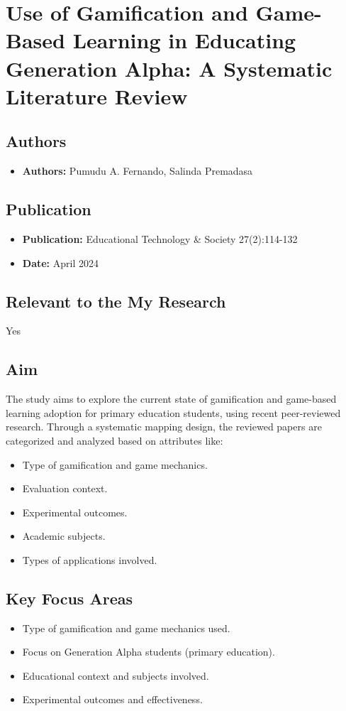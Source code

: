 \section{Use of Gamification and Game-Based Learning in Educating Generation Alpha: A Systematic Literature Review}

\subsection{Authors}
\begin{itemize}
    \item \textbf{Authors:} Pumudu A. Fernando, Salinda Premadasa
\end{itemize}

\subsection{Publication}
\begin{itemize}
    \item \textbf{Publication:} Educational Technology \& Society 27(2):114-132
    \item \textbf{Date:} April 2024 
\end{itemize}

\subsection{Relevant to the My Research}
Yes

\subsection{Aim}
The study aims to explore the current state of gamification and game-based learning adoption for primary education students, using recent peer-reviewed research. Through a systematic mapping design, the reviewed papers are categorized and analyzed based on attributes like:
\begin{itemize}
    \item Type of gamification and game mechanics.
    \item Evaluation context.
    \item Experimental outcomes.
    \item Academic subjects.
    \item Types of applications involved.
\end{itemize}

\subsection{Key Focus Areas}
\begin{itemize}
    \item Type of gamification and game mechanics used.
    \item Focus on Generation Alpha students (primary education).
    \item Educational context and subjects involved.
    \item Experimental outcomes and effectiveness.
\end{itemize}

